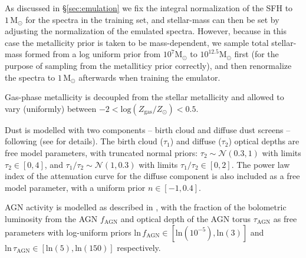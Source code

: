\documentclass[twocolumn]{aastex62}
\def\ln{\mathrm{ln}}
\begin{document}
As discussed in \S \ref{sec:emulation} we fix the integral normalization of the SFH to $1\,\mathrm{M}_\odot$ for the spectra in the training set, and stellar-mass can then be set by adjusting the normalization of the emulated spectra. However, because in this case the metallicity prior is taken to be mass-dependent, we sample total stellar-mass formed from a log uniform prior from $10^7\mathrm{M}_\odot$ to $10^{12.5}\mathrm{M}_\odot$ first (for the purpose of sampling from the metalliticy prior correctly), and then renormalize the spectra to $1\,\mathrm{M}_\odot$ afterwards when training the emulator.

Gas-phase metallicity is decoupled from the stellar metallicity and allowed to vary (uniformly) between $−2 < \mathrm{log}(Z_\mathrm{gas}/Z_\odot) < 0.5$.

Dust is modelled with two components -- birth cloud and diffuse dust screens -- following \citet{charlot2000} (see \citealp{leja2017} for details). The birth cloud ($\tau_1$) and diffuse ($\tau_2$) optical depths are free model parameters, with truncated normal priors: $\tau_2\sim \mathcal{N}(0.3, 1)$ with limits $\tau_2\in[0,4]$, and $\tau_1 / \tau_2 \sim\mathcal{N}(1, 0.3)$ with limits $\tau_1/\tau_2\in[0,2]$. The power law index of the \citet{calzetti2000} attenuation curve for the diffuse component is also included as a free model parameter, with a uniform prior $n\in[-1, 0.4]$.

AGN activity is modelled as described in \citet{leja2018}, with the fraction of the bolometric luminosity from the AGN $f_\mathrm{AGN}$ and optical depth of the AGN torus $\tau_\mathrm{AGN}$ as free parameters with log-uniform priors $\ln\,f_\mathrm{AGN}\in[\ln(10^{-5}), \ln(3)]$  and $\ln\,\tau_\mathrm{AGN}\in[\ln(5), \ln(150)]$ respectively.
\end{document}
